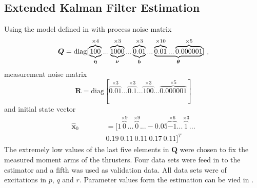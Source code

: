 \subsection{Extended Kalman Filter Estimation}
Using the model defined in  with process noise matrix
\begin{equation*}
\boldsymbol{Q}=\text{diag}[\underbrace{\overbrace{100}^{\times4}}_{\boldsymbol{\eta}}... \underbrace{\overbrace{1000}^{\times3}}_{\boldsymbol{\nu}}...\underbrace{\overbrace{0.01}^{\times3}}_{\boldsymbol{b}}... \underbrace{\overbrace{0.01}^{\times10}... \overbrace{0.000001}^{\times5}}_{\boldsymbol{\theta}}]\text{ ,}
\end{equation*}
measurement noise matrix
\begin{equation*}
\boldsymbol{R} = \text{diag}[\overbrace{0.01}^{\times3}... \overbrace{0.1}^{\times3}... \overbrace{100}^{\times3}... \overbrace{0.000001}^{\times5}]
\end{equation*}
and initial state vector
\begin{align}
\hat{\boldsymbol{x}}_0 &= [1 \overbrace{0}^{\times9}... \overbrace{0}^{\times9}... -0.05 \overbrace{-1}^{\times6}... \overbrace{1}^{\times3}...\\
\qquad\qquad& 0.19~ 0.11~ 0.11~ 0.17~ 0.11]^T
\end{align}
The extremely low values of the last five elements in $\boldsymbol{Q}$ were chosen to fix the measured moment arms of the thrusters. Four data sets were feed in to the estimator and a fifth was used as validation data. All data sets were of excitations in $p$, $q$ and $r$. Parameter values form the estimation can be vied in .
